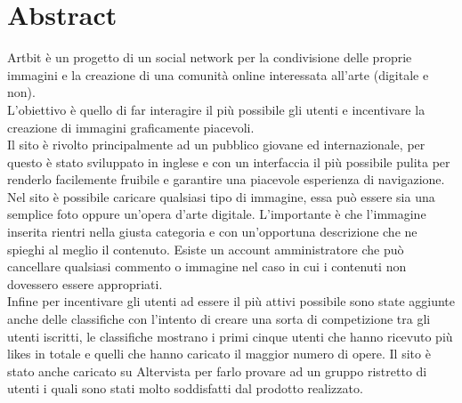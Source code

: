 \documentclass[openany, a4paper, 12pt]{report}
\begin{document}


	\chapter{Abstract}
	Artbit è un progetto di un social network per la condivisione delle proprie immagini e la creazione di una comunità online interessata all'arte (digitale e non).\\
	L'obiettivo è quello di far interagire il più possibile gli utenti e incentivare la creazione di immagini graficamente piacevoli.\\
	 Il sito è rivolto principalmente ad un pubblico giovane ed internazionale, per questo è stato sviluppato in inglese e con un interfaccia il più possibile pulita per renderlo facilemente fruibile e garantire una piacevole esperienza di navigazione.\\
	Nel sito è possibile caricare qualsiasi tipo di immagine, essa può essere sia una semplice foto oppure un'opera d'arte digitale. L'importante è che l'immagine inserita rientri nella giusta categoria e con un'opportuna descrizione che ne spieghi al meglio il contenuto.
	Esiste un account amministratore che può cancellare qualsiasi commento o immagine nel caso in cui i contenuti non dovessero essere appropriati.\\
	Infine per incentivare gli utenti ad essere il più attivi possibile sono state aggiunte anche delle classifiche con l'intento di creare una sorta di competizione tra gli utenti iscritti, le classifiche mostrano i primi cinque utenti che hanno ricevuto più likes in totale e quelli che hanno caricato il maggior numero di opere.
	Il sito è stato anche caricato su Altervista per farlo provare ad un gruppo ristretto di utenti i quali sono stati molto soddisfatti dal prodotto realizzato.
\end{document}
